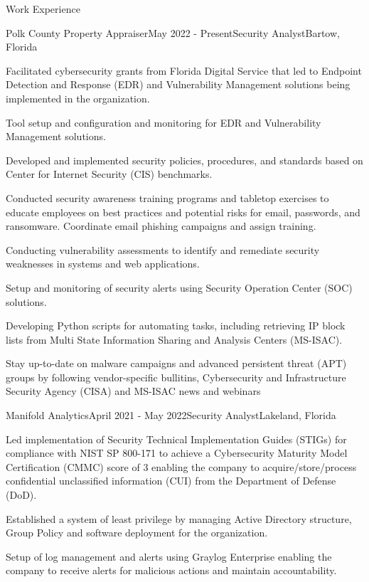 \documentclass{resume} %
\begin{document}

\begin{rSection}{Work Experience}

	\begin{rSubsection}{Polk County Property Appraiser}{May 2022 - Present}{Security Analyst}{Bartow, Florida}
		\item Facilitated cybersecurity grants from Florida Digital Service that led to Endpoint Detection and Response (EDR) and Vulnerability Management solutions being implemented in the organization.
		\item Tool setup and configuration and monitoring for EDR and Vulnerability Management solutions.
		\item Developed and implemented security policies, procedures, and standards based on Center for Internet Security (CIS) benchmarks.
		\item Conducted security awareness training programs and tabletop exercises to educate employees on best practices and potential risks for email, passwords, and ransomware. Coordinate email phishing campaigns and assign training.
		\item Conducting vulnerability assessments to identify and remediate security weaknesses in systems and web applications. %
		\item Setup and monitoring of security alerts using Security Operation Center (SOC) solutions.
		\item Developing Python scripts for automating tasks, including retrieving IP block lists from Multi State Information Sharing and Analysis Centers (MS-ISAC).
		\item Stay up-to-date on malware campaigns and advanced persistent threat (APT) groups by following vendor-specific bullitins, Cybersecurity and Infrastructure Security Agency (CISA) and MS-ISAC news and webinars
	\end{rSubsection}
	\begin{rSubsection}{Manifold Analytics}{April 2021 - May 2022}{Security Analyst}{Lakeland, Florida}
		\item Led implementation of Security Technical Implementation Guides (STIGs) for compliance with NIST SP 800-171 to achieve a Cybersecurity Maturity Model Certification (CMMC) score of 3 enabling the company to acquire/store/process confidential unclassified information (CUI) from the Department of Defense (DoD).
		\item Established a system of least privilege by managing Active Directory structure, Group Policy and software deployment for the organization.
		\item Setup of log management and alerts using Graylog Enterprise enabling the company to receive alerts for malicious actions and maintain accountability.
	\end{rSubsection}


\end{rSection}
\end{document}

